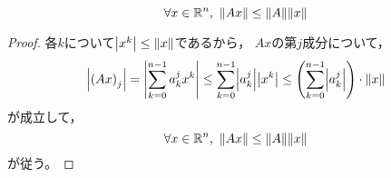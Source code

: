 \documentclass[b5paper,draft]{ltjsbook}
\begin{document}
\begin{prop}[作用素ノルムの不等式1]
    \begin{equation}
        \forall x\in \R^n,\ \norm{Ax}\leq \norm{A}\norm{x}
    \end{equation}
    \begin{proof}
        各$k$について$\abs{x^k}\leq \norm{x}$であるから，
        $Ax$の第$j$成分について，
        \begin{equation}
            \abs{\pare{Ax}_j}=\abs{\sum_{k=0}^{n-1}a^j_kx^k}
            \leq \sum_{k=0}^{n-1} \abs{a^j_k}\abs{x^k}
            \leq \pare{\sum_{k=0}^{n-1}\abs{a^j_k}}\cdot \norm{x}
        \end{equation}
        が成立して，
        \begin{equation}
            \forall x\in \R^n,\ \norm{Ax}\leq \norm{A}\norm{x}
        \end{equation}
        が従う。
    \end{proof}
\end{prop}
\end{document}
